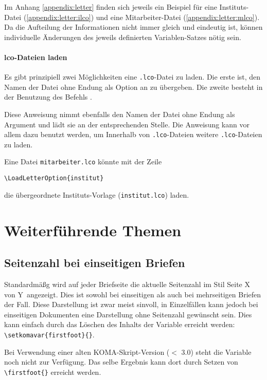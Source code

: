 Im Anhang \ref{appendix:letter} finden sich jeweils ein Beispiel für eine
Instituts-Datei (\ref{appendix:letter:ilco}) und eine Mitarbeiter-Datei
(\ref{appendix:letter:mlco}). Da die Aufteilung der Informationen nicht immer 
gleich und eindeutig ist, können individuelle Änderungen des jeweils definierten
Variablen-Satzes nötig sein.

\paragraph{lco-Dateien laden}

Es gibt prinzipiell zwei Möglichkeiten eine \texttt{.lco}-Datei zu laden.
Die erste ist, den Namen der Datei ohne Endung als Option an
 zu übergeben.
Die zweite besteht in der Benutzung des Befehls .

\begin{Declaration}
\end{Declaration}

Diese Anweisung nimmt ebenfalls den Namen der Datei ohne Endung als
Argument und lädt sie an der entsprechenden Stelle.
Die Anweisung kann vor allem dazu benutzt werden, um Innerhalb von
\texttt{.lco}-Dateien weitere \texttt{.lco}-Dateien zu laden.

\begin{example}
  Eine Datei \lstinline{mitarbeiter.lco} könnte mit der Zeile
\begin{lstlisting}
\LoadLetterOption{institut}
\end{lstlisting}
  die übergeordnete Instituts-Vorlage (\lstinline{institut.lco}) laden.
\end{example}

\section{Weiterführende Themen}

\subsection{Seitenzahl bei einseitigen Briefen}

Standardmäßg wird auf jeder Briefseite die aktuelle Seitenzahl
im Stil \glqq Seite X von Y\grqq\ angezeigt. Dies ist sowohl bei einseitigen
als auch bei mehrseitigen Briefen der Fall.
Diese Darstellung ist zwar meist sinvoll, in Einzelfällen kann jedoch bei
einseitigen Dokumenten eine Darstellung ohne Seitenzahl gewünscht sein.
Dies kann einfach durch das Löschen des Inhalts der Variable
 erreicht werden: \lstinline!\setkomavar{firstfoot}{}!.

\begin{important}
  Bei Verwendung einer alten KOMA-Skript-Version ($<$ 3.0) steht die
  Variable  noch nicht zur Verfügung.
  Das selbe Ergebnis kann dort durch Setzen von \lstinline!\firstfoot{}!
  erreicht werden.
\end{important}




